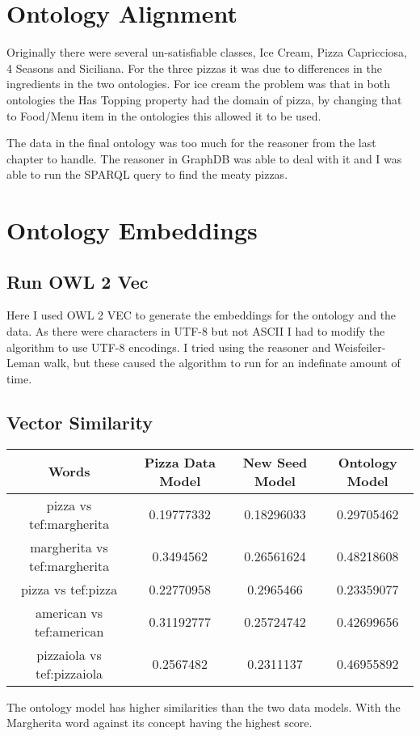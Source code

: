 \documentclass[11pt]{report} %
\begin{document}
\chapter{Ontology Alignment}
Originally there were several un-satisfiable classes, Ice Cream, Pizza Capricciosa, 4 Seasons and Siciliana.
For the three pizzas it was due to differences in the ingredients in the two ontologies.
For ice cream the problem was that in both ontologies the Has Topping property had the domain of pizza, by changing that to Food/Menu item in the ontologies this allowed it to be used.

The data in the final ontology was too much for the reasoner from the last chapter to handle.
The reasoner in GraphDB was able to deal with it and I was able to run the SPARQL query to find the meaty pizzas.



\chapter{Ontology Embeddings}

\section{Run OWL 2 Vec}
Here I used OWL 2 VEC to generate the embeddings for the ontology and the data.
As there were characters in UTF-8 but not ASCII I had to modify the algorithm to use UTF-8 encodings.
I tried using the reasoner and Weisfeiler-Leman walk, but these caused the algorithm to run for an indefinate amount of time.

\section{Vector Similarity}
\begin{center}
	\begin{tabular}{ | c | c | c | c |}
		\hline
		\textbf{Words} & \textbf{Pizza Data Model} & \textbf{New Seed Model} & \textbf{Ontology Model} \\
		\hline
		pizza vs tef:margherita & 0.19777332 & 0.18296033 & 0.29705462 \\
		\hline
		margherita vs tef:margherita & 0.3494562 & 0.26561624 & 0.48218608 \\
		\hline
		pizza vs tef:pizza & 0.22770958 & 0.2965466 & 0.23359077 \\
		\hline
		american vs tef:american & 0.31192777 & 0.25724742 & 0.42699656 \\
		\hline
		pizzaiola vs tef:pizzaiola & 0.2567482 & 0.2311137 & 0.46955892 \\
		\hline
	\end{tabular}
\end{center}

The ontology model has higher similarities than the two data models.
With the Margherita word against its concept having the highest score.
\end{document}
